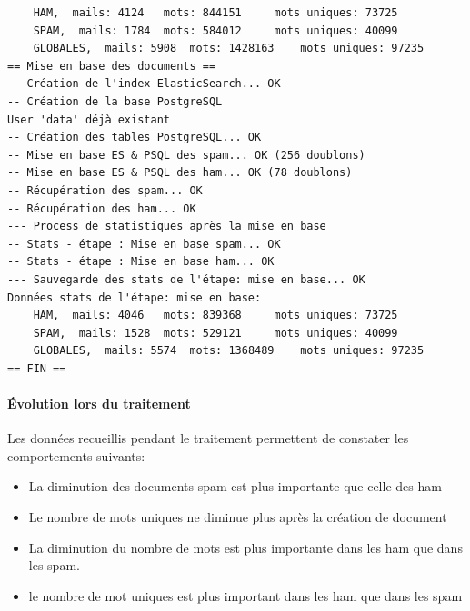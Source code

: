 \documentclass[a4paper,12pt]{article}
\begin{document}
\begin{verbatim}
	HAM,  mails: 4124 	mots: 844151	 mots uniques: 73725
	SPAM,  mails: 1784 	mots: 584012	 mots uniques: 40099
	GLOBALES,  mails: 5908 	mots: 1428163	 mots uniques: 97235
== Mise en base des documents ==
-- Création de l'index ElasticSearch... OK
-- Création de la base PostgreSQL
User 'data' déjà existant
-- Création des tables PostgreSQL... OK
-- Mise en base ES & PSQL des spam... OK (256 doublons)                                                                                                                                                                                       
-- Mise en base ES & PSQL des ham... OK (78 doublons)                                                                                                                                                                                         
-- Récupération des spam... OK
-- Récupération des ham... OK
--- Process de statistiques après la mise en base
-- Stats - étape : Mise en base spam... OK                                                                                                                                                                                                    
-- Stats - étape : Mise en base ham... OK                                                                                                                                                                                                     
--- Sauvegarde des stats de l'étape: mise en base... OK
Données stats de l'étape: mise en base:
	HAM,  mails: 4046 	mots: 839368	 mots uniques: 73725
	SPAM,  mails: 1528 	mots: 529121	 mots uniques: 40099
	GLOBALES,  mails: 5574 	mots: 1368489	 mots uniques: 97235
== FIN ==

		\end{verbatim}
		
		\paragraph{Évolution lors du traitement}
			Les données recueillis pendant le traitement permettent de constater les comportements suivants:
			\begin{itemize}
				\item La diminution des documents spam est plus importante que celle des ham 
				\item Le nombre de mots uniques ne diminue plus après la création de document
				\item La diminution du nombre de mots est plus importante dans les ham que dans les spam. 
				\item le nombre de mot uniques est plus important dans les ham que dans les spam
			\end{itemize}
			
\end{document}
